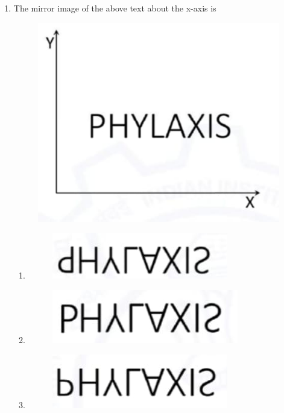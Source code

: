 \documentclass[journal,12pt,onecolumn]{article}
\theoremstyle{remark}
\begin{document}
\begin{enumerate}
\item The mirror image of the above text about the x-axis is
\begin{figure}[H]
    \centering
    \includegraphics[width=0.7\columnwidth]{figs/2q2.jpg}
    \caption{}
    \label{fig:q2}
\end{figure}
\begin{multicols}{2}
\begin{enumerate}
    \item \begin{figure}[H]
    \centering
    \includegraphics[width=0.5\columnwidth]{figs/2q2a.jpg}
    \caption{}
    \label{fig:q2}
\end{figure}
\item \begin{figure}[H]
    \centering
    \includegraphics[width=0.5\columnwidth]{figs/2q2b.jpg}
    \caption{}
    \label{fig:q2}
\end{figure}
\item \begin{figure}[H]
    \centering
    \includegraphics[width=0.5\columnwidth]{figs/2q2c.jpg}

\end{figure}
\end{enumerate}
\end{multicols}
\end{enumerate}
\end{document}
